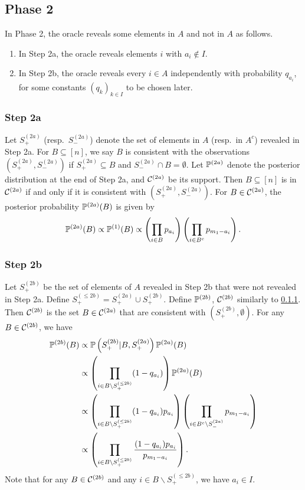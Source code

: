 \subsection{Phase 2} \label{sec:inf:phase-2}
In Phase 2, the oracle reveals some elements in $A$ and not in $A$ as follows.
\begin{enumerate}[label=2\alph*.]
  \item In Step 2a, the oracle reveals elements $i$ with $a_i\not \in I$.
  \item In Step 2b, the oracle reveals every $i\in A$ independently with probability $q_{a_i}$, for some constants $(q_k)_{k\in I}$ to be chosen later.
\end{enumerate}

\subsubsection{Step 2a} \label{sec:inf:phase-2:step-a}
Let $S^{(2a)}_+$ (resp.~$S^{(2a)}_-$) denote the set of elements in $A$ (resp.~in $A^c$) revealed in Step 2a.
For $B\subseteq [n]$, we say $B$ is consistent with the observations $\left(S^{(2a)}_+, S^{(2a)}_-\right)$ if $S^{(2a)}_+ \subseteq B$ and $S^{(2a)}_-\cap B = \emptyset$.
Let $\mathbb{P}^{(2a)}$ denote the posterior distribution at the end of Step 2a, and $\mathcal{C}^{(2a)}$ be its support.
Then $B\subseteq [n]$ is in $\mathcal{C}^{(2a)}$ if and only if it is consistent with $\left(S^{(2a)}_+, S^{(2a)}_-\right)$.
For $B\in \mathcal{C}^{(2a)}$, the posterior probability $\mathbb{P}^{(2a)}(B)$ is given by
\begin{align} \label{eqn:inf-phase-2-step-a:post}
  \mathbb{P}^{(2a)}(B) \propto \mathbb{P}^{(1)}(B)
  \propto \left(\prod_{i\in B} p_{a_i}\right) \left(\prod_{i\in B^c}p_{m_1 - a_i}\right).
\end{align}

\subsubsection{Step 2b} \label{sec:inf:phase-2:step-b}
Let $S^{(2b)}_+$ be the set of elements of $A$ revealed in Step 2b that were not revealed in Step 2a.
Define $S^{(\le 2b)}_+ = S^{(2a)}_+ \cup S^{(2b)}_+$.
Define $\mathbb{P}^{(2b)}$, $\mathcal{C}^{(2b)}$ similarly to \cref{sec:inf:phase-2:step-a}.
Then $\mathcal{C}^{(2b)}$ is the set $B\in \mathcal{C}^{(2a)}$ that are consistent with $\left(S^{(2b)}_+,\emptyset\right)$.
For any $B\in \mathcal{C}^{(2b)}$, we have
\begin{align} \label{eqn:inf-phase-2-step-b:post-step}
  \mathbb{P}^{(2b)}(B) &\propto \mathbb{P}\left(S^{(2b)}_+ | B, S^{(2a)}_+\right) \mathbb{P}^{(2a)}(B) \\
  \nonumber &\propto \left(\prod_{i\in B\backslash S^{(\le 2b)}_+} (1-q_{a_i})\right) \mathbb{P}^{(2a)}(B) \\
  \nonumber &\propto \left(\prod_{i\in B\backslash S^{(\le 2b)}_+} (1-q_{a_i}) p_{a_i}\right)\left(\prod_{i\in B^c\backslash S^{(2a)}_-}p_{m_1 - a_i}\right) \\
  \nonumber &\propto \left(\prod_{i\in B\backslash S^{(\le 2b)}_+} \frac{(1-q_{a_i}) p_{a_i}}{p_{m_1 - a_i}}\right).
\end{align}
Note that for any $B\in \mathcal{C}^{(2b)}$ and any $i\in B\backslash S^{(\le 2b)}_+$, we have $a_i \in I$.

